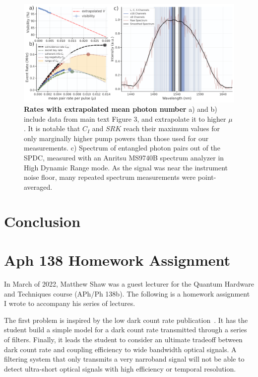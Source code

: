 \documentclass[11pt]{caltech_thesis} %
\begin{document}
\hypertarget{fig:scan_extrapolate}{%
\begin{figure}
\centering
\includegraphics[width=1\textwidth,height=\textheight]{./chapter_05/figs/scan_extrapolate_light.pdf}
\caption[{Rates with extrapolated mean photon number}]{\textbf{Rates with extrapolated mean photon number} a) and b) include data from main text Figure 3, and extrapolate it to higher $\mu$. It is notable that $C_I$ and $SRK$ reach their maximum values for only marginally higher pump powers than those used for our measurements. c) Spectrum of entangled photon pairs out of the SPDC, measured with an Anritsu MS9740B spectrum analyzer in High Dynamic Range mode. As the signal was near the instrument noise floor, many repeated spectrum measurements were point-averaged.}
\label{fig:scan_extrapolate}
\end{figure}
}

\hypertarget{conclusion}{%
\chapter{Conclusion}\label{conclusion}}

\appendix

\hypertarget{aph-138-homework-assignment}{%
\chapter{Aph 138 Homework Assignment}\label{aph-138-homework-assignment}}

In March of 2022, Matthew Shaw was a guest lecturer for the Quantum Hardware and Techniques course (APh/Ph 138b). The following is a homework assignment I wrote to accompany his series of lectures.

The first problem is inspired by the low dark count rate publication~\autocite{Mueller:21}. It has the student build a simple model for a dark count rate transmitted through a series of filters. Finally, it leads the student to consider an ultimate tradeoff between dark count rate and coupling efficiency to wide bandwidth optical signals. A filtering system that only transmits a very narroband signal will not be able to detect ultra-short optical signals with high efficiency or temporal resolution.
\end{document}
